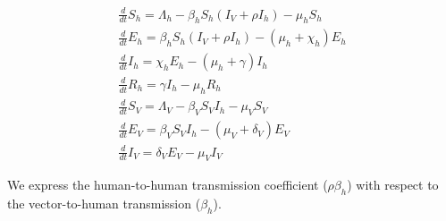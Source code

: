 \documentclass[10pt,letterpaper]{article}
\begin{document}

\begin{equation} \label{eq:zika_model}
\begin{array}{l}
\frac{d}{d t} S_{h}=\Lambda_{h}-\beta_{h} S_{h}\left(I_{V}+\rho I_{h}\right)-\mu_{h} S_{h} \\
\frac{d}{d t} E_{h}=\beta_{h} S_{h}\left(I_{V}+\rho I_{h}\right)-\left(\mu_{h}+\chi_{h}\right) E_{h} \\
\frac{d}{d t} I_{h}=\chi_{h} E_{h}-\left(\mu_{h}+\gamma\right) I_{h} \\
\frac{d}{d t} R_{h}=\gamma I_{h}-\mu_{h} R_{h} \\[2ex]
\frac{d}{d t} S_{V}=\Lambda_{V}-\beta_{V} S_{V} I_{h}-\mu_{V} S_{V} \\
\frac{d}{d t} E_{V}=\beta_{V} S_{V} I_{h}-\left(\mu_{V}+\delta_{V}\right) E_{V} \\
\frac{d}{d t} I_{V}=\delta_{V} E_{V}-\mu_{V} I_{V}
\end{array}
\end{equation}

We express the human-to-human transmission coefficient ($\rho \beta_h$) with respect to the vector-to-human transmission ($\beta_h$).
\end{document}
